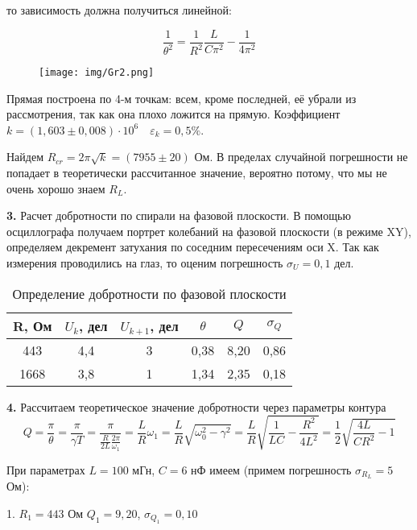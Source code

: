 \documentclass[a4paper, 12pt]{article}
\begin{document}
        то зависимость должна получиться линейной:

        \[\frac{1}{\theta^2} = \frac{1}{R^2}\frac{L}{C\pi^2} - \frac{1}{4\pi^2}\]
        \begin{figure}[h]
            \centering
            \texttt{[image: img/Gr2.png]}
        \end{figure}


        Прямая построена по 4-м точкам: всем, кроме последней, её убрали из рассмотрения, так как она плохо ложится на прямую. Коэффициент $k = (1,603 \pm 0,008)\cdot 10^6 \quad \varepsilon_k = 0,5 \%$.

        Найдем $R_{cr} = 2\pi \sqrt{k} = (7955 \pm 20)$ Ом. В пределах случайной погрешности не попадает в теоретически рассчитанное значение, вероятно потому, что мы не очень хорошо знаем $R_L$.

        \textbf{3.} Расчет добротности по спирали на фазовой плоскости. В помощью осциллографа получаем портрет колебаний на фазовой плоскости (в режиме XY), определяем декремент затухания по соседним пересечениям оси X. Так как измерения проводились на глаз, то оценим погрешность $\sigma_U = 0,1$ дел.

        \begin{table}[h]
            \centering
            \begin{tabular}{|c|c|c|c|c|c|}
                \hline
                R, Ом & $U_k$, дел & $U_{k + 1}$, дел & $\theta$ & $Q$ & $\sigma_{Q}$  \\ \hline
                443 & 4,4 & 3 & 0,38 & 8,20 & 0,86 \\ \hline
                1668 & 3,8 & 1 & 1,34 & 2,35 & 0,18 \\ \hline
            \end{tabular}
            \caption{Определение добротности по фазовой плоскости}
        \end{table}

        \textbf{4.} Рассчитаем теоретическое значение добротности через параметры контура
        \[Q = \frac{\pi}{\theta} = \frac{\pi}{\gamma T} = \frac{\pi}{\frac{R}{2L}\frac{2\pi}{\omega_1}} = \frac{L}{R}\omega_1 = \frac{L}{R}\sqrt{\omega_0^2 - \gamma^2} = \frac{L}{R}\sqrt{\frac{1}{LC} - \frac{R^2}{4L^2}} = \frac{1}{2}\sqrt{\frac{4L}{CR^2} - 1}\]

        При параметрах $L = 100$ мГн, $C = 6$ нФ имеем (примем погрешность $\sigma_{R_L} = 5$ Ом):

        1. $R_1 = 443$ Ом $Q_1 = 9,20$, $\sigma_{Q_1} = 0,10$
\end{document}
